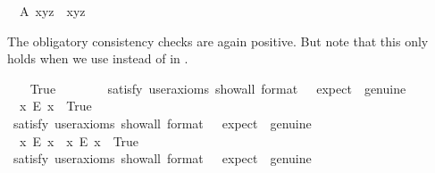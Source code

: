 \begin{isabellebody}
\ \ A{}{\isacharcolon}\ {\isachardoublequoteopen}x{\isasymcdot}{\isacharparenleft}y{\isasymcdot}z{\isacharparenright}\ {\isasymcong}\ {\isacharparenleft}x{\isasymcdot}y{\isacharparenright}{\isasymcdot}z{\isachardoublequoteclose}%
\begin{isamarkuptext}%
The obligatory consistency checks are again positive. 
 But note that this only holds when we use \isa{{\isasymsimeq}} instead of  \isa{{\isasymcong}} in  .%
\end{isamarkuptext}\isamarkuptrue%
\ \ \isamarkupfalse%
\ True\ \ %
\isanewline
\ \ \ \ \isamarkupfalse%
\ {\isacharbrackleft}satisfy{\isacharcomma}\ user{\isacharunderscore}axioms{\isacharcomma}\ show{\isacharunderscore}all{\isacharcomma}\ format\ {\isacharequal}\ {}{\isacharcomma}\ expect\ {\isacharequal}\ genuine{\isacharbrackright}%
\isadelimproof
\ %
\endisadelimproof
%
\isatagproof
{}\isamarkupfalse%
%
\endisatagproof
{\isafoldproof}%
%
\isadelimproof
%
\endisadelimproof
\isanewline
\ \ \isamarkupfalse%
\ \ {\isachardoublequoteopen}{\isasymexists}x{\isachardot}\ \isactrlbold {\isasymnot}{\isacharparenleft}E\ x{\isacharparenright}{\isachardoublequoteclose}\ \ True\ \ \ %
\ \ \isanewline
\ \ \ \ \isamarkupfalse%
\ {\isacharbrackleft}satisfy{\isacharcomma}\ user{\isacharunderscore}axioms{\isacharcomma}\ show{\isacharunderscore}all{\isacharcomma}\ format\ {\isacharequal}\ {}{\isacharcomma}\ expect\ {\isacharequal}\ genuine{\isacharbrackright}%
\isadelimproof
\ %
\endisadelimproof
%
\isatagproof
{}\isamarkupfalse%
%
\endisatagproof
{\isafoldproof}%
%
\isadelimproof
%
\endisadelimproof
\isanewline
\ \ \isamarkupfalse%
\ \ {\isachardoublequoteopen}{\isacharparenleft}{\isasymexists}x{\isachardot}\ \isactrlbold {\isasymnot}{\isacharparenleft}E\ x{\isacharparenright}{\isacharparenright}\ {\isasymand}\ {\isacharparenleft}{\isasymexists}x{\isachardot}\ {\isacharparenleft}E\ x{\isacharparenright}{\isacharparenright}{\isachardoublequoteclose}\ \ True\ \ %
\ \isanewline
\ \ \ \ \isamarkupfalse%
\ {\isacharbrackleft}satisfy{\isacharcomma}\ user{\isacharunderscore}axioms{\isacharcomma}\ show{\isacharunderscore}all{\isacharcomma}\ format\ {\isacharequal}\ {}{\isacharcomma}\ expect\ {\isacharequal}\ genuine{\isacharbrackright}%

\end{isabellebody}
